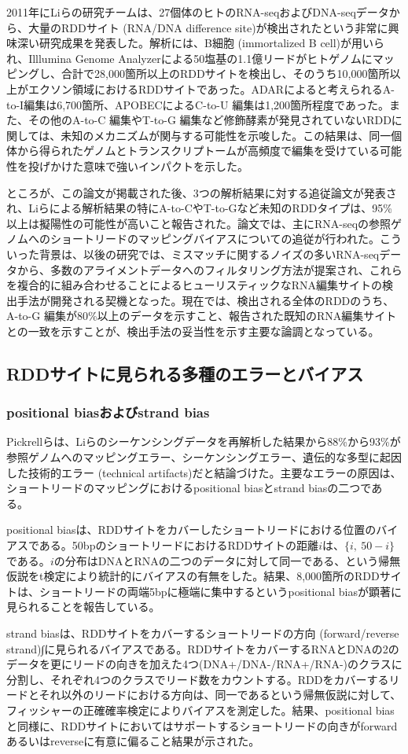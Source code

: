 2011年にLiらの研究チームは、27個体のヒトのRNA-seqおよびDNA-seqデータから、大量のRDDサイト (RNA/DNA difference site)が検出されたという非常に興味深い研究成果を発表した。解析には、B細胞 (immortalized B cell)が用いられ、Illlumina Genome Analyzerによる50塩基の1.1億リードがヒトゲノムにマッピングし、合計で28,000箇所以上のRDDサイトを検出し、そのうち10,000箇所以上がエクソン領域におけるRDDサイトであった。ADARによると考えられるA-to-I編集は6,700箇所、APOBECによるC-to-U 編集は1,200箇所程度であった。また、その他のA-to-C 編集やT-to-G 編集など修飾酵素が発見されていないRDDに関しては、未知のメカニズムが関与する可能性を示唆した。この結果は、同一個体から得られたゲノムとトランスクリプトームが高頻度で編集を受けている可能性を投げかけた意味で強いインパクトを示した。
\par
ところが、この論文が掲載された後、3つの解析結果に対する追従論文が発表され、Liらによる解析結果の特にA-to-CやT-to-Gなど未知のRDDタイプは、95\%以上は擬陽性の可能性が高いこと報告された。論文では、主にRNA-seqの参照ゲノムへのショートリードのマッピングバイアスについての追従が行われた。こういった背景は、以後の研究では、ミスマッチに関するノイズの多いRNA-seqデータから、多数のアライメントデータへのフィルタリング方法が提案され、これらを複合的に組み合わせることによるヒューリスティックなRNA編集サイトの検出手法が開発される契機となった。現在では、検出される全体のRDDのうち、A-to-G 編集が80\%以上のデータを示すこと、報告された既知のRNA編集サイトとの一致を示すことが、検出手法の妥当性を示す主要な論調となっている。

\subsection{RDDサイトに見られる多種のエラーとバイアス}
\subsubsection{positional biasおよびstrand bias}
Pickrellらは、Liらのシーケンシングデータを再解析した結果から88\%から93\%が参照ゲノムへのマッピングエラー、シーケンシングエラー、遺伝的な多型に起因した技術的エラー (technical artifacts)だと結論づけた。主要なエラーの原因は、ショートリードのマッピングにおけるpositional biasとstrand biasの二つである。
\par
positional biasは、RDDサイトをカバーしたショートリードにおける位置のバイアスである。50bpのショートリードにおけるRDDサイトの距離$i$は、$\{i,\ 50-i\}$である。$i$の分布はDNAとRNAの二つのデータに対して同一である、という帰無仮説をt検定により統計的にバイアスの有無をした。結果、8,000箇所のRDDサイトは、ショートリードの両端5bpに極端に集中するというpositional biasが顕著に見られることを報告している。
\par
strand biasは、RDDサイトをカバーするショートリードの方向 (forward/reverse strand)∫に見られるバイアスである。RDDサイトをカバーするRNAとDNAの2のデータを更にリードの向きを加えた4つ(DNA+/DNA-/RNA+/RNA-)のクラスに分割し、それぞれ4つのクラスでリード数をカウントする。RDDをカバーするリードとそれ以外のリードにおける方向は、同一であるという帰無仮説に対して、フィッシャーの正確確率検定によりバイアスを測定した。結果、positional biasと同様に、RDDサイトにおいてはサポートするショートリードの向きがforwardあるいはreverseに有意に偏ること結果が示された。


